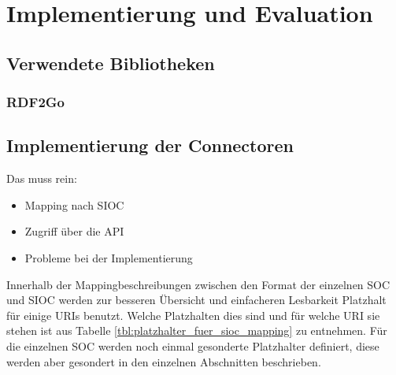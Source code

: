 
\chapter{Implementierung und Evaluation} %
\label{cha:implementierung_und_evaluation}


\section{Verwendete Bibliotheken} %
\label{sec:verwendete_bibliotheken}

\subsection{RDF2Go} %
\label{sub:rdf2go}





\section{Implementierung der Connectoren} %
\label{sec:implementierung_der_connectoren}

Das muss rein:
\begin{itemize}
    \item Mapping nach SIOC
    \item Zugriff über die API
    \item Probleme bei der Implementierung
\end{itemize}

Innerhalb der Mappingbeschreibungen zwischen den Format der einzelnen SOC und SIOC werden zur besseren Übersicht und einfacheren Lesbarkeit Platzhalt für einige URIs benutzt. Welche Platzhalten dies sind und für welche URI sie stehen ist aus Tabelle \ref{tbl:platzhalter_fuer_sioc_mapping} zu entnehmen. Für die einzelnen SOC werden noch einmal gesonderte Platzhalter definiert, diese werden aber gesondert in den einzelnen Abschnitten beschrieben. 

